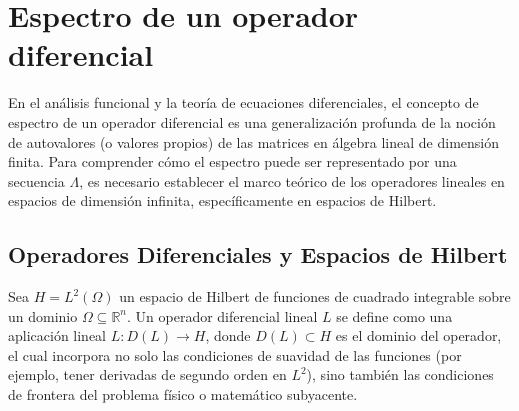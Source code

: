 \documentclass[a4paper]{article}
\begin{document}
\section{Espectro de un operador diferencial}

En el análisis funcional y la teoría de ecuaciones diferenciales, el concepto de espectro de un operador diferencial es una generalización profunda de la noción de autovalores (o valores propios) de las matrices en álgebra lineal de dimensión finita. Para comprender cómo el espectro puede ser representado por una secuencia $\Lambda$, es necesario establecer el marco teórico de los operadores lineales en espacios de dimensión infinita, específicamente en espacios de Hilbert.

\subsection*{Operadores Diferenciales y Espacios de Hilbert}
Sea $H = L^2(\Omega)$ un espacio de Hilbert de funciones de cuadrado integrable sobre un dominio $\Omega \subseteq \mathbb{R}^n$. Un operador diferencial lineal $L$ se define como una aplicación lineal $L: D(L) \to H$, donde $D(L) \subset H$ es el dominio del operador, el cual incorpora no solo las condiciones de suavidad de las funciones (por ejemplo, tener derivadas de segundo orden en $L^2$), sino también las condiciones de frontera del problema físico o matemático subyacente.
\end{document}
